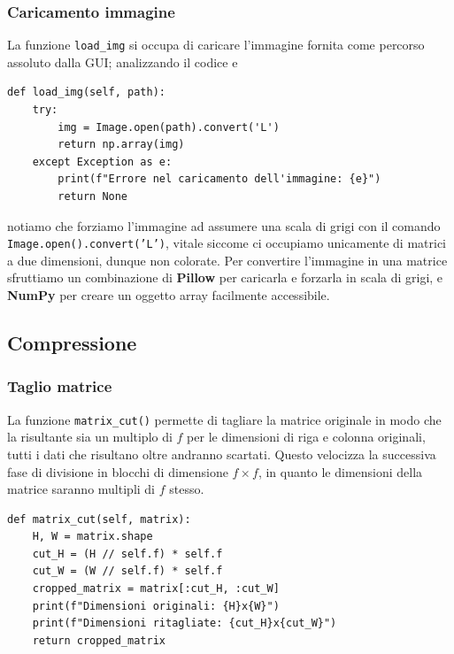 	\subsubsection{Caricamento immagine}
	La funzione \texttt{load\_img} si occupa di caricare l'immagine fornita come percorso assoluto dalla GUI; analizzando il codice e
	\begin{listing}[ht]
		\begin{verbatim}
def load_img(self, path):
	try:
		img = Image.open(path).convert('L')
		return np.array(img)
	except Exception as e:
		print(f"Errore nel caricamento dell'immagine: {e}")
		return None
		\end{verbatim}
	\end{listing}
	notiamo che forziamo l'immagine ad assumere una scala di grigi con il comando \texttt{Image.open().convert('L')}, vitale siccome ci occupiamo unicamente di matrici a due dimensioni, dunque non colorate.
	Per convertire l'immagine in una matrice sfruttiamo un combinazione di \textbf{Pillow} per caricarla e forzarla in scala di grigi, e \textbf{NumPy} per creare un oggetto array facilmente accessibile.
	
\subsection{Compressione}
	\subsubsection{Taglio matrice}
	La funzione \texttt{matrix\_cut()} permette di tagliare la matrice originale in modo che la risultante sia un multiplo di $f$ per le dimensioni di riga e colonna originali, tutti i dati che risultano oltre andranno scartati.
	Questo velocizza la successiva fase di divisione in blocchi di dimensione \textit{$f \times f$}, in quanto le dimensioni della matrice saranno multipli di $f$ stesso.
	\begin{listing}[ht]
		\begin{verbatim}
def matrix_cut(self, matrix):
	H, W = matrix.shape
	cut_H = (H // self.f) * self.f
	cut_W = (W // self.f) * self.f
	cropped_matrix = matrix[:cut_H, :cut_W]        
	print(f"Dimensioni originali: {H}x{W}")
	print(f"Dimensioni ritagliate: {cut_H}x{cut_W}")
	return cropped_matrix
		\end{verbatim}
	\end{listing}
	

